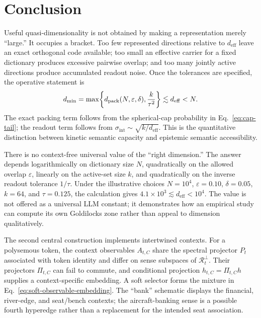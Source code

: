\documentclass[
  aps,
  reprint,
  superscriptaddress,
  floatfix,
  nofootinbib,
  longbibliography
]{revtex4-2}
\newcommand{\deff}{d_{\mathrm{eff}}}
\newcommand{\sint}{\sigma_{\mathrm{int}}}
\begin{document}
\section{Conclusion}
\label{sec:conclusion}

Useful quasi-dimensionality is not obtained by making a representation merely
``large.''  It occupies a bracket.  Too few represented directions relative
to $\deff$ leave an exact orthogonal code available; too small an effective
carrier for a fixed dictionary produces excessive pairwise overlap; and too
many jointly active directions produce accumulated readout noise.  Once the
tolerances are specified, the operative statement is
%
\begin{equation}
\label{eq:summary}
d_{\min}
=\max\!\left\{
d_{\rm pack}(N,\varepsilon,\delta),\frac{k}{\tau^2}
\right\}
\lesssim\deff<N.
\end{equation}
%
The exact packing term follows from the spherical-cap probability in
Eq.~\eqref{eq:cap-tail}; the readout term follows from
$\sint\sim\sqrt{k/\deff}$.  This is the quantitative distinction between
kinetic semantic capacity and epistemic semantic accessibility.

There is no context-free universal value of the ``right dimension.''  The
answer depends logarithmically on dictionary size $N$, quadratically on the
allowed overlap $\varepsilon$, linearly on the active-set size $k$, and
quadratically on the inverse readout tolerance $1/\tau$.  Under the
illustrative choices $N=10^4$, $\varepsilon=0.10$, $\delta=0.05$, $k=64$,
and $\tau=0.125$, the calculation gives
$4.1\times10^3\lesssim\deff<10^4$.  The value is not offered as a universal
LLM constant; it demonstrates how an empirical study can compute its own
Goldilocks zone rather than appeal to dimension qualitatively.

The second central construction implements intertwined contexts.  For a
polysemous token, the context observables $A_{t,C}$ share the spectral
projector $P_t$ associated with token identity and differ on sense subspaces
of $\mathcal R_t^\perp$.  Their projectors $\Pi_{t,C}$ can fail to commute,
and conditional projection
$h_{t,C}=\Pi_{t,C}h$ supplies a context-specific embedding.  A soft selector
forms the mixture in Eq.~\eqref{eq:soft-observable-embedding}.  The ``bank''
schematic displays the financial, river-edge, and seat/bench contexts; the
aircraft-banking sense is a possible fourth hyperedge rather than a replacement
for the intended seat association.
\end{document}
